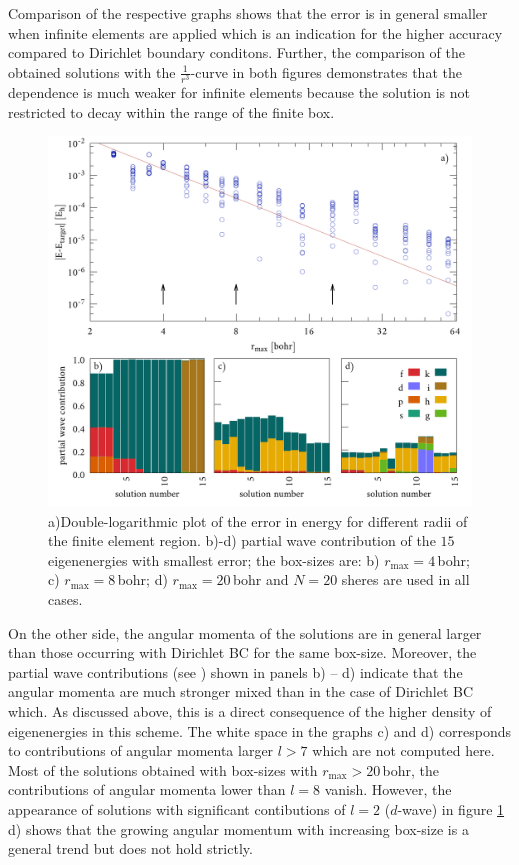 Comparison of the respective graphs shows that the error is in general smaller when infinite elements are applied which is an indication for the higher accuracy compared to Dirichlet boundary conditons.
Further, the comparison of the obtained solutions with the $\frac{1}{r^3}$-curve in both figures demonstrates that the dependence is much weaker for infinite elements because the solution is not restricted to decay within the range of the finite box.
\begin{figure}[h]
\includegraphics[width=\textwidth]{Figures/BC/BoxsInfEL}
\caption{a)Double-logarithmic plot of the error in energy for different radii of the finite element region.
b)-d) partial wave contribution  of the $15$ eigenenergies with smallest error;
the box-sizes are: b) $r_\text{max}=4\,$bohr; c) $r_\text{max}=8\,$bohr; d) $r_\text{max}=20\,$bohr and $N=20$ sheres are used in all cases.}
\label{fig:InfBoxs}
\end{figure}
On the other side, the angular momenta of the solutions are in general larger than those occurring with Dirichlet BC for the same box-size.
Moreover, the partial wave contributions (see ) shown in panels b) -- d) indicate that the angular momenta are much stronger mixed than in the case of Dirichlet BC which.
As discussed above, this is a direct consequence of the higher density of eigenenergies in this scheme.
The white space in the graphs c) and d) corresponds to contributions of angular momenta larger $l>7$ which are not computed here.
Most of the solutions obtained with box-sizes with $r_\text{max}>20\,$bohr, the contributions of angular momenta lower than $l=8$ vanish.
However, the appearance of solutions with significant contibutions of $l=2$ ($d$-wave) in figure \ref{fig:InfBoxs} d) shows that the growing angular momentum with increasing box-size is a general trend but does not hold strictly.

